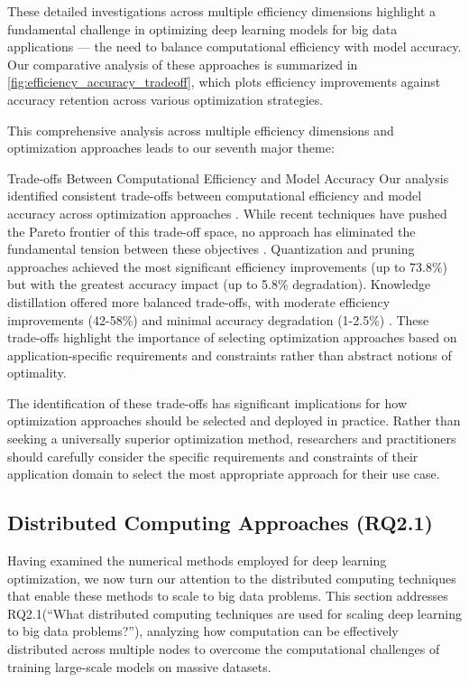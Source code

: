 \documentclass[acmsmall]{acmart}
\begin{document}
These detailed investigations across multiple efficiency dimensions highlight a fundamental challenge in optimizing deep learning models for big data applications --- the need to balance computational efficiency with model accuracy. Our comparative analysis of these approaches is summarized in \cref{fig:efficiency_accuracy_tradeoff}, which plots efficiency improvements against accuracy retention across various optimization strategies.

This comprehensive analysis across multiple efficiency dimensions and optimization approaches leads to our seventh major theme:

\begin{themebox}{Trade-offs Between Computational Efficiency and Model Accuracy}
    Our analysis identified consistent trade-offs between computational efficiency and model accuracy across optimization approaches \citep{Wang2021, Kim2022, Lin2022, Park2022}. While recent techniques have pushed the Pareto frontier of this trade-off space, no approach has eliminated the fundamental tension between these objectives \citep{Deb2014}. Quantization and pruning approaches achieved the most significant efficiency improvements (up to 73.8\%) but with the greatest accuracy impact (up to 5.8\% degradation). Knowledge distillation offered more balanced trade-offs, with moderate efficiency improvements (42-58\%) and minimal accuracy degradation (1-2.5\%) \citep{Hinton2015}. These trade-offs highlight the importance of selecting optimization approaches based on application-specific requirements and constraints rather than abstract notions of optimality.
\end{themebox}

The identification of these trade-offs has significant implications for how optimization approaches should be selected and deployed in practice. Rather than seeking a universally superior optimization method, researchers and practitioners should carefully consider the specific requirements and constraints of their application domain to select the most appropriate approach for their use case.

\subsection{Distributed Computing Approaches (RQ2.1)}\label{subsec:distributed-computing-approaches-rq21}
Having examined the numerical methods employed for deep learning optimization, we now turn our attention to the distributed computing techniques that enable these methods to scale to big data problems. This section addresses RQ2.1(``What distributed computing techniques are used for scaling deep learning to big data problems?''), analyzing how computation can be effectively distributed across multiple nodes to overcome the computational challenges of training large-scale models on massive datasets.
\end{document}
